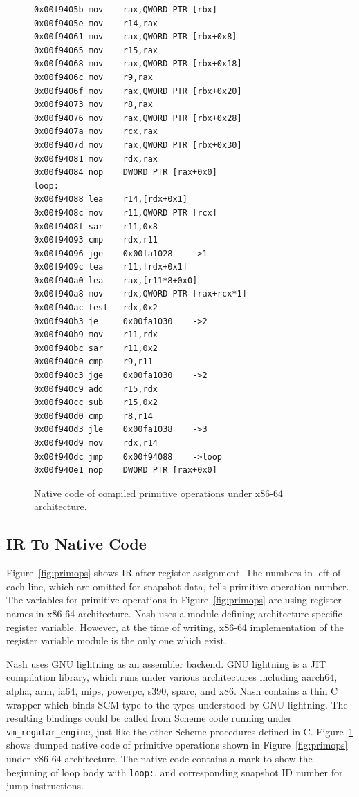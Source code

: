 \documentclass[preprint, 10pt]{sigplanconf}
\begin{document}
\begin{figure}
  \centering
  \small
\begin{verbatim}
0x00f9405b mov    rax,QWORD PTR [rbx]
0x00f9405e mov    r14,rax
0x00f94061 mov    rax,QWORD PTR [rbx+0x8]
0x00f94065 mov    r15,rax
0x00f94068 mov    rax,QWORD PTR [rbx+0x18]
0x00f9406c mov    r9,rax
0x00f9406f mov    rax,QWORD PTR [rbx+0x20]
0x00f94073 mov    r8,rax
0x00f94076 mov    rax,QWORD PTR [rbx+0x28]
0x00f9407a mov    rcx,rax
0x00f9407d mov    rax,QWORD PTR [rbx+0x30]
0x00f94081 mov    rdx,rax
0x00f94084 nop    DWORD PTR [rax+0x0]
loop:
0x00f94088 lea    r14,[rdx+0x1]
0x00f9408c mov    r11,QWORD PTR [rcx]
0x00f9408f sar    r11,0x8
0x00f94093 cmp    rdx,r11
0x00f94096 jge    0x00fa1028    ->1
0x00f9409c lea    r11,[rdx+0x1]
0x00f940a0 lea    rax,[r11*8+0x0]
0x00f940a8 mov    rdx,QWORD PTR [rax+rcx*1]
0x00f940ac test   rdx,0x2
0x00f940b3 je     0x00fa1030    ->2
0x00f940b9 mov    r11,rdx
0x00f940bc sar    r11,0x2
0x00f940c0 cmp    r9,r11
0x00f940c3 jge    0x00fa1030    ->2
0x00f940c9 add    r15,rdx
0x00f940cc sub    r15,0x2
0x00f940d0 cmp    r8,r14
0x00f940d3 jle    0x00fa1038    ->3
0x00f940d9 mov    rdx,r14
0x00f940dc jmp    0x00f94088    ->loop
0x00f940e1 nop    DWORD PTR [rax+0x0]
\end{verbatim}
\caption{Native code of compiled primitive operations under x86-64
  architecture.}
\label{fig:ncode}
\end{figure}

\subsection{IR To Native Code}
Figure~\hyperref[fig:primops]{\ref{fig:primops}} shows IR after register
assignment. The numbers in left of each line, which are omitted for snapshot
data, tells primitive operation number. The variables for primitive operations
in Figure~\hyperref[fig:primops]{\ref{fig:primops}} are using register names
in x86-64 architecture. Nash uses a module defining architecture specific
register variable. However, at the time of writing, x86-64 implementation of
the register variable module is the only one which exist.

Nash uses GNU lightning as an assembler backend.  GNU lightning is a JIT
compilation library, which runs under various architectures including aarch64,
alpha, arm, ia64, mips, powerpc, s390, sparc, and x86. Nash contains a thin C
wrapper which binds SCM type to the types understood by GNU lightning. The
resulting bindings could be called from Scheme code running under
\texttt{vm\_regular\_engine}, just like the other Scheme procedures defined in
C. Figure~\hyperref[fig:ncode]{\ref{fig:ncode}} shows dumped native code of
primitive operations shown in Figure~\hyperref[fig:primops]{\ref{fig:primops}}
under x86-64 architecture. The native code contains a mark to show the beginning
of loop body with \texttt{loop:}, and corresponding snapshot ID number for jump
instructions.
\end{document}
